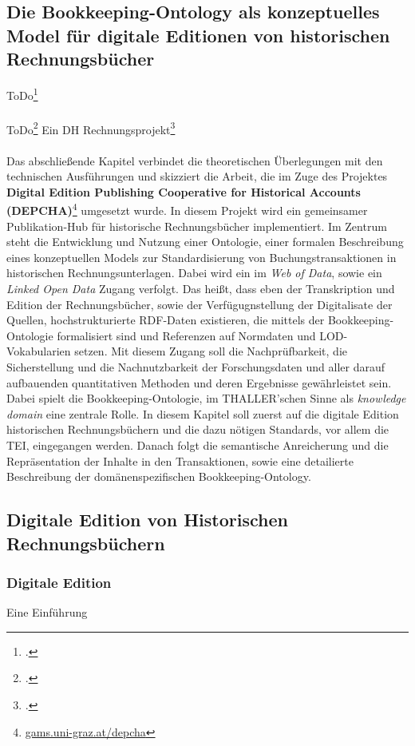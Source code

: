 \documentclass[12pt,a4paper]{article}
\begin{document}
\subsection{Die Bookkeeping-Ontology als konzeptuelles Model für digitale Editionen von historischen Rechnungsbücher}
\label{BK}

ToDo\footcite[][S.9-12]{tomasekmedea}
\\
\\
ToDo\footcite[][S.101-109]{wurz2016dh}
Ein DH Rechnungsprojekt\footcite[][S.109-113]{wurz2016dh}
\\
\\
Das abschließende Kapitel verbindet die theoretischen Überlegungen mit den technischen Ausführungen und skizziert die Arbeit, die im Zuge des Projektes \textbf{Digital Edition Publishing Cooperative for Historical Accounts (DEPCHA)}\footnote{\url{gams.uni-graz.at/depcha}} umgesetzt wurde. In diesem Projekt wird ein gemeinsamer Publikation-Hub für historische Rechnungsbücher implementiert. Im Zentrum steht die Entwicklung und Nutzung einer Ontologie, einer formalen Beschreibung eines konzeptuellen Models zur Standardisierung von Buchungstransaktionen in historischen Rechnungsunterlagen. Dabei wird ein im \textit{Web of Data}, sowie ein \textit{Linked Open Data} Zugang verfolgt. Das heißt, dass eben der Transkription und Edition der Rechnungsbücher, sowie der Verfügugnstellung der Digitalisate der Quellen, hochstrukturierte RDF-Daten existieren, die mittels der Bookkeeping-Ontologie formalisiert sind und Referenzen auf Normdaten und LOD-Vokabularien setzen. Mit diesem Zugang soll die Nachprüfbarkeit, die Sicherstellung und die Nachnutzbarkeit der Forschungsdaten und aller darauf aufbauenden quantitativen Methoden und deren Ergebnisse gewährleistet sein. Dabei spielt die Bookkeeping-Ontologie, im THALLER'schen Sinne als \textit{knowledge domain} eine zentrale Rolle. In diesem Kapitel soll zuerst auf die digitale Edition historischen Rechnungsbüchern und die dazu nötigen Standards, vor allem die TEI, eingegangen werden. Danach folgt die semantische Anreicherung und die Repräsentation der Inhalte in den Transaktionen, sowie eine detailierte Beschreibung der domänenspezifischen Bookkeeping-Ontology.  

\subsection{Digitale Edition von Historischen Rechnungsbüchern}
\subsubsection{Digitale Edition}
Eine Einführung
\end{document}
